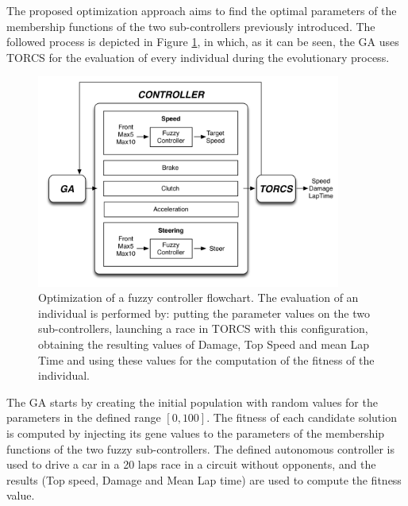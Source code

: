 \documentclass[conference]{IEEEtran}
\begin{document}


The proposed optimization approach aims to find the optimal parameters of the membership functions of the two sub-controllers previously introduced. 
The followed process is depicted in Figure \ref{fig:ga}, in which, as it can be seen, the GA uses TORCS for the evaluation of every individual during the evolutionary process.
\begin{figure}[!ht]
  \label{fig:ga}
  \begin{center}
    \includegraphics[width=10cm]{fig/flowchart}
  \end{center}
  \caption{Optimization of a fuzzy controller flowchart. The evaluation of an individual is performed by: putting the parameter values on the two sub-controllers, launching a race in TORCS with this configuration, obtaining the resulting values of Damage, Top Speed and mean Lap Time and using these values for the computation of the fitness of the individual.}
\end{figure}	
The GA starts by creating the initial population with random values
for the parameters in the defined range $[0,100]$. The fitness of each
candidate solution is computed by injecting its gene values to the
parameters of the membership functions of the two fuzzy
sub-controllers. The defined autonomous controller is used to drive a
car in a 20 laps race in a circuit without opponents, and the
results (Top speed, Damage and Mean Lap time) are used to compute the
fitness value. 
\end{document}
